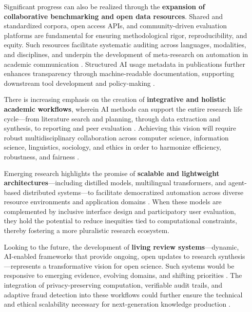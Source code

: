 \documentclass[sigconf]{acmart}
\begin{document}
Significant progress can also be realized through the \textbf{expansion of collaborative benchmarking and open data resources}. Shared and standardized corpora, open access APIs, and community-driven evaluation platforms are fundamental for ensuring methodological rigor, reproducibility, and equity. Such resources facilitate systematic auditing across languages, modalities, and disciplines, and underpin the development of meta-research on automation in academic communication \cite{ref41,ref62,ref63,ref68,ref78,ref80,ref81,ref84,ref86,ref87,ref88,ref89,ref90,ref91,ref94,ref99,ref100,ref103,ref104,ref105,ref108,ref109,ref111,ref112,ref113,ref115,ref117}. Structured AI usage metadata in publications further enhances transparency through machine-readable documentation, supporting downstream tool development and policy-making \cite{ref110,ref115}.

There is increasing emphasis on the creation of \textbf{integrative and holistic academic workflows}, wherein AI methods can support the entire research life cycle—from literature search and planning, through data extraction and synthesis, to reporting and peer evaluation \cite{ref61,ref68,ref89,ref99,ref103,ref104,ref108,ref109,ref110,ref115,ref117}. Achieving this vision will require robust multidisciplinary collaboration across computer science, information science, linguistics, sociology, and ethics in order to harmonize efficiency, robustness, and fairness \cite{ref108,ref110}.

Emerging research highlights the promise of \textbf{scalable and lightweight architectures}—including distilled models, multilingual transformers, and agent-based distributed systems—to facilitate democratized automation across diverse resource environments and application domains \cite{ref38,ref62,ref63,ref64,ref68,ref81,ref99,ref102,ref103,ref109,ref110,ref111,ref113,ref115}. When these models are complemented by inclusive interface design and participatory user evaluation, they hold the potential to reduce inequities tied to computational constraints, thereby fostering a more pluralistic research ecosystem.

Looking to the future, the development of \textbf{living review systems}—dynamic, AI-enabled frameworks that provide ongoing, open updates to research synthesis—represents a transformative vision for open science. Such systems would be responsive to emerging evidence, evolving domains, and shifting priorities \cite{ref78,ref84,ref97,ref103,ref104,ref105,ref108,ref110,ref112,ref113,ref114}. The integration of privacy-preserving computation, verifiable audit trails, and adaptive fraud detection into these workflows could further ensure the technical and ethical scalability necessary for next-generation knowledge production \cite{ref73,ref76,ref80,ref81,ref85,ref92,ref94,ref104,ref115,ref117}.
\end{document}
